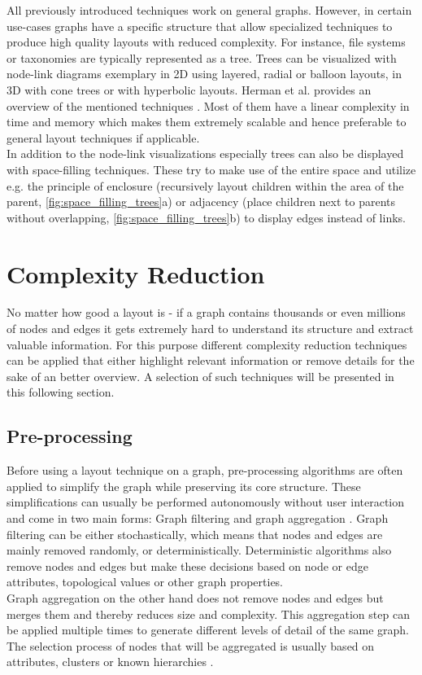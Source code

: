 All previously introduced techniques work on general graphs. However, in certain use-cases graphs have a specific structure that allow specialized techniques to produce high quality layouts with reduced complexity. For instance, file systems or taxonomies are typically represented as a tree. Trees can be visualized with node-link diagrams exemplary in 2D using layered, radial or balloon layouts, in 3D with cone trees or with hyperbolic layouts. Herman et al. provides an overview of the mentioned techniques \cite{Herman2000}. Most of them have a linear complexity in time and memory which makes them extremely scalable and hence preferable to general layout techniques if applicable. \\
In addition to the node-link visualizations especially trees can also be displayed with space-filling techniques. These try to make use of the entire space and utilize e.g. the principle of enclosure (recursively layout children within the area of the parent, \autoref{fig:space_filling_trees}a) or adjacency (place children next to parents without overlapping, \autoref{fig:space_filling_trees}b) to display edges instead of links\cite{VonLandesberger2011}.



\section{Complexity Reduction}
No matter how good a layout is - if a graph contains thousands or even millions of nodes and edges it gets extremely hard to understand its structure and extract valuable information. For this purpose different complexity reduction techniques can be applied that either highlight relevant information or remove details for the sake of an better overview. A selection of such techniques will be presented in this following section.

\subsection{Pre-processing}
Before using a layout technique on a graph, pre-processing algorithms are often applied to simplify the graph while preserving its core structure. These simplifications can usually be performed autonomously without user interaction and come in two main forms: Graph filtering and graph aggregation \cite{VonLandesberger2011}.
Graph filtering can be either stochastically, which means that nodes and edges are mainly removed randomly, or deterministically. Deterministic algorithms also remove nodes and edges but make these decisions based on node or edge attributes, topological values or other graph properties.\\
Graph aggregation on the other hand does not remove nodes and edges but merges them and thereby reduces size and complexity. This aggregation step can be applied multiple times to generate different levels of detail of the same graph. The selection process of nodes that will be aggregated is usually based on attributes, clusters or known hierarchies \cite{VonLandesberger2011}.

